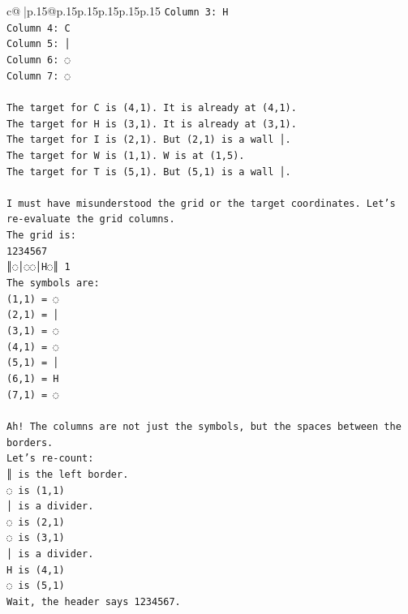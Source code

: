 \documentclass{article}
\begin{document}
{\begin{supertabular}{c@{$\;$}|p{.15\linewidth}@{}p{.15\linewidth}p{.15\linewidth}p{.15\linewidth}p{.15\linewidth}p{.15\linewidth}}
{{{\texttt{Column 3: H} \\
\texttt{Column 4: C} \\
\texttt{Column 5: │} \\
\texttt{Column 6: ◌} \\
\texttt{Column 7: ◌} \\
\\ 
\texttt{The target for C is (4,1). It is already at (4,1).} \\
\texttt{The target for H is (3,1). It is already at (3,1).} \\
\texttt{The target for I is (2,1). But (2,1) is a wall │.} \\
\texttt{The target for W is (1,1). W is at (1,5).} \\
\texttt{The target for T is (5,1). But (5,1) is a wall │.} \\
\\ 
\texttt{I must have misunderstood the grid or the target coordinates. Let's re{-}evaluate the grid columns.} \\
\texttt{The grid is:} \\
\texttt{1234567} \\
\texttt{║◌│◌◌│H◌║ 1} \\
\texttt{The symbols are:} \\
\texttt{(1,1) = ◌} \\
\texttt{(2,1) = │} \\
\texttt{(3,1) = ◌} \\
\texttt{(4,1) = ◌} \\
\texttt{(5,1) = │} \\
\texttt{(6,1) = H} \\
\texttt{(7,1) = ◌} \\
\\ 
\texttt{Ah! The columns are not just the symbols, but the spaces between the borders.} \\
\texttt{Let's re{-}count:} \\
\texttt{║ is the left border.} \\
\texttt{◌ is (1,1)} \\
\texttt{│ is a divider.} \\
\texttt{◌ is (2,1)} \\
\texttt{◌ is (3,1)} \\
\texttt{│ is a divider.} \\
\texttt{H is (4,1)} \\
\texttt{◌ is (5,1)} \\
\texttt{Wait, the header says 1234567.} \\
}}}
\end{supertabular}}
\end{document}
